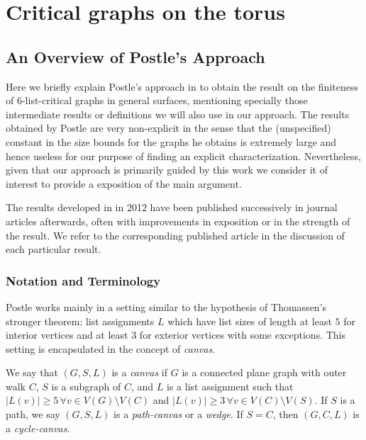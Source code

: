 \section{Critical graphs on the torus}


\subsection{An Overview of Postle's Approach}

Here we briefly explain Postle's approach in \cite{postlethesis} to obtain the result on the finiteness of 6-list-critical graphs in general surfaces, mentioning specially those intermediate results or definitions we will also use in our approach. The results obtained by Postle are very non-explicit in the sense that the (unspecified) constant in the size bounds for the graphs he obtains is extremely large and hence useless for our purpose of finding an explicit characterization. Nevertheless, given that our approach is primarily guided by this work we consider it of interest to provide a exposition of the main argument.

The results developed in \cite{postlethesis} in 2012 have been published successively in journal articles afterwards, often with improvements in exposition or in the strength of the result. We refer to the corresponding published article in the discussion of each particular result.

\subsubsection{Notation and Terminology}

Postle works mainly in a setting similar to the hypothesis of Thomassen's stronger theorem: list assignments $L$ which have list sizes of length at least $5$ for interior vertices and at least $3$ for exterior vertices with some exceptions. This setting is encapsulated in the concept of \emph{canvas}.

\begin{definition}[Canvas]
We say that $(G, S, L)$ is a \emph{canvas} if $G$ is a connected plane graph
 with outer walk $C$, $S$ is a subgraph of $C$, and $L$ is a list assignment
  such that $|L(v)| \geq 5 \, \forall v \in V(G) \setminus V(C)$ and
   $|L(v)| \geq 3 \, \forall v \in V(C) \setminus V(S)$. If $S$ is a path,
    we say $(G, S, L)$ is a \emph{path-canvas} or a \emph{wedge}. If $S = C$,
     then $(G, C, L)$ is a \emph{cycle-canvas}.
\end{definition}

